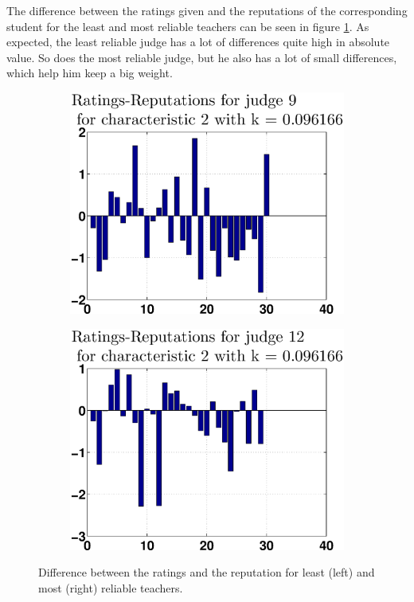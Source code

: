 \documentclass[12pt,a4paper]{article}
\begin{document}
The difference between the ratings given and the reputations of the corresponding student for the least and most reliable teachers can be seen in figure \ref{diffLM}. As expected, the least reliable judge has a lot of differences quite high in absolute value. So does the most reliable judge, but he also has a lot of small differences, which help him keep a big weight.

\begin{figure}[!h]
\centering
\begin{subfigure}[b]{0.48\textwidth}
\centering
\includegraphics[width = \textwidth]{preprocessSelect/ppsdiffRaReLeastK3fb89e54e9211a25c2.eps}
\end{subfigure}
\begin{subfigure}[b]{0.48\textwidth}
\centering
\includegraphics[width = \textwidth]{preprocessSelect/ppsdiffRaReMostK3fb89e54e9211a25c2.eps}
\end{subfigure}
\caption{\label{diffLM}Difference between the ratings and the reputation for least (left) and most (right) reliable teachers.}
\end{figure}
\end{document}

